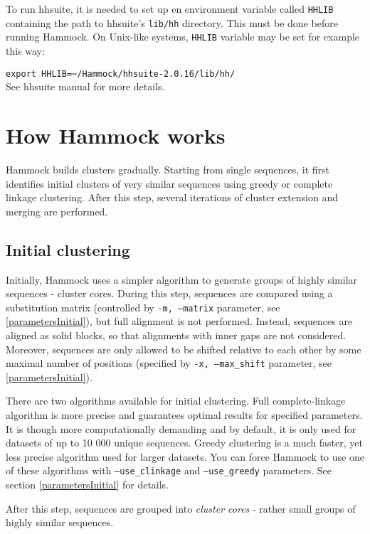 \documentclass[11pt, a4paper, twoside, titlepage]{article}
\begin{document}
To run hhsuite, it is needed to set up en environment variable called \texttt{HHLIB} containing the path to hhsuite's \texttt{lib/hh} directory. This must be done before running Hammock. On Unix-like systems, \texttt{HHLIB} variable may be set for example this way: \newline

\verb|export HHLIB=~/Hammock/hhsuite-2.0.16/lib/hh/|\\

See hhsuite manual for more details.


\section{How Hammock works}
\label{howhammockworks}
Hammock builds clusters gradually. Starting from single sequences, it first identifies initial clusters of very similar sequences using greedy or complete linkage clustering. After this step, several iterations of cluster extension and merging are performed.

\subsection{Initial clustering}
Initially, Hammock uses a simpler algorithm to generate groups of highly similar sequences - cluster cores. During this step, sequences are compared using a substitution matrix (controlled by \texttt{-m, --matrix} parameter, see \ref{parametersInitial}), but full alignment is not performed. Instead, sequences are aligned as solid blocks, so that alignments with inner gaps are not considered. Moreover, sequences are only allowed to be shifted relative to each other by some maximal number of positions (specified by \texttt{-x, --max\_shift} parameter, see \ref{parametersInitial}). 

There are two algorithms available for initial clustering. Full complete-linkage algorithm is more precise and guarantees optimal results for specified parameters. It is though more computationally demanding and by default, it is only used for datasets of up to 10 000 unique sequences. Greedy clustering is a much faster, yet less precise algorithm used for larger datasets. You can force Hammock to use one of these algorithms with \texttt{--use\_clinkage} and \texttt{--use\_greedy} parameters. See section \ref{parametersInitial} for details.

After this step, sequences are grouped into \emph{cluster cores} - rather small groups of highly similar sequences.
\end{document}
